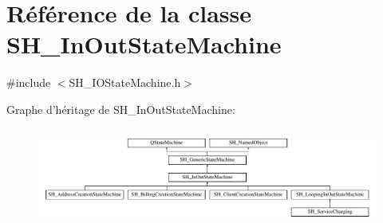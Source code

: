 \hypertarget{classSH__InOutStateMachine}{\section{Référence de la classe S\-H\-\_\-\-In\-Out\-State\-Machine}
\label{classSH__InOutStateMachine}
}


{\ttfamily \#include $<$S\-H\-\_\-\-I\-O\-State\-Machine.\-h$>$}

Graphe d'héritage de S\-H\-\_\-\-In\-Out\-State\-Machine\-:\begin{figure}[H]
\begin{center}
\leavevmode
\includegraphics[height=3.240741cm]{classSH__InOutStateMachine}
\end{center}
\end{figure}
